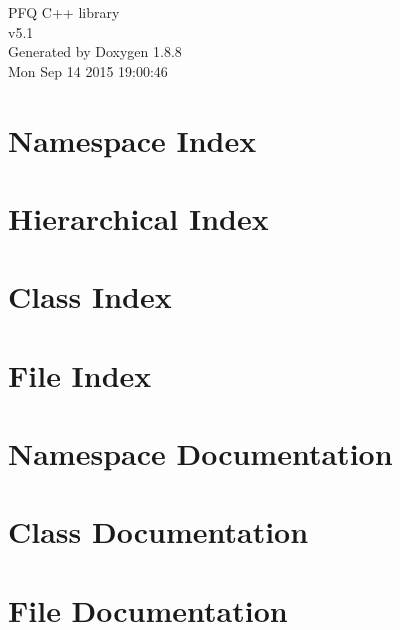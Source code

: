 \documentclass[twoside]{book}
\newcommand{\+}{\discretionary{\mbox{\scriptsize$\hookleftarrow$}}{}{}}
\newcommand{\clearemptydoublepage}{%
  \newpage{\pagestyle{empty}\cleardoublepage}%
}
\begin{document}
\hypersetup{pageanchor=false,
             bookmarks=true,
             bookmarksnumbered=true,
             pdfencoding=unicode
            }
\begin{titlepage}
\vspace*{7cm}
\begin{center}%
{\Large P\+F\+Q C++ library \\[1ex]\large v5.\+1 }\\
\vspace*{1cm}
{\large Generated by Doxygen 1.8.8}\\
\vspace*{0.5cm}
{\small Mon Sep 14 2015 19:00:46}\\
\end{center}
\end{titlepage}
\clearemptydoublepage
\tableofcontents
\clearemptydoublepage
{}
\hypersetup{pageanchor=true}

\chapter{Namespace Index}

\chapter{Hierarchical Index}

\chapter{Class Index}

\chapter{File Index}

\chapter{Namespace Documentation}



\chapter{Class Documentation}















\chapter{File Documentation}





\newpage
{}
{}
\printindex
\end{document}

